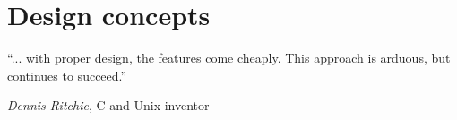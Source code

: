 \section{Design concepts}

``... with proper design, the features come cheaply. This approach is
arduous, but continues to succeed.''
\begin{flushright}
\emph{Dennis Ritchie}, C and Unix inventor
\end{flushright}

